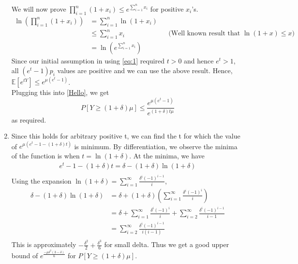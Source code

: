 \begin{enumerate}
\[    \]
    We will now prove $\prod_{i=1}^n (1+x_i) \le e^{\sum_{i=1}^n x_i}$ for positive $x_i$'s.
    \begin{align*}
        \ln\left(\prod_{i=1}^n (1+x_i)\right)&=\sum_{i=1}^n \ln(1+x_i)\\
        &\le \sum_{i=1}^n x_i && \text{(Well known result that $\ln(1+x)\le x$)}\\
        &= \ln\left(e^{\sum_{i=1}^n x_i}\right)
    \end{align*}
    Since our initial assumption in using \ref{eq:1} required $t>0$ and hence $e^t > 1$, all $(e^t-1)p_i$ values are positive and we can use the above result.
    Hence, $\mathbb{E}[e^{tY}] \le e^{\mu (e^t-1)}$.\\
    Plugging this into \ref{Hello}, we get
    \[
        P[Y\ge (1+\delta)\mu]\le \frac{e^{\mu(e^t-1)}}{e^{(1+\delta)t\mu}}
    \]
    as required.\\
    \item Since this holds for arbitrary positive t, we can find the t for which the value of $e^{\mu (e^t-1-(1+\delta)t)}$ is minimum. By differentiation, we observe the minima of the function is when $t=\ln(1+\delta)$. At the minima, we have
    \begin{align*}
        e^t-1-(1+\delta)t = \delta-(1+\delta)\ln(1+\delta)\\
    \end{align*}
    Using the expansion $\ln(1+\delta)=\sum_{i=1}^{\infty}\frac{\delta^i(-1)^{i-1}}{i}$,
    \begin{align*}
        \delta - (1+\delta)\ln(1+\delta) &= \delta + (1+\delta)(\sum_{i=1}^{\infty}\frac{\delta^i(-1)^i}{i})\\
        &= \delta + \sum_{i=1}^{\infty}\frac{\delta^i(-1)^i}{i} + \sum_{i=2}^{\infty}\frac{\delta^{i}(-1)^{i-1}}{i-1}\\
        &= \sum_{i=2}^{\infty} \frac{\delta^i(-1)^{i-1}}{i(i-1)}\\
    \end{align*}
    This is approximately $-\frac{\delta^2}{2} + \frac{\delta^3}{6}$ for small delta. Thus we get a good upper bound of $e^{\frac{-\mu\delta^2(3-\delta)}{6}}$ for $P[Y\ge (1+\delta)\mu]$.\\

\end{enumerate}
